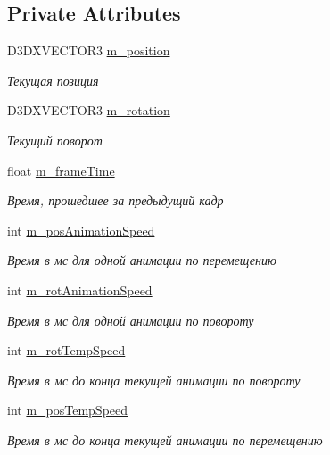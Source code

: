 \subsection*{Private Attributes}
\begin{DoxyCompactItemize}
\item 
D3\+D\+X\+V\+E\+C\+T\+O\+R3 \hyperlink{class_position_class_aa217d89b940ef5fdb462e8caa0d265f2}{m\+\_\+position}
\begin{DoxyCompactList}\small\item\em Текущая позиция \end{DoxyCompactList}\item 
D3\+D\+X\+V\+E\+C\+T\+O\+R3 \hyperlink{class_position_class_a1e690785eacec06ababe95e2e4fc72b0}{m\+\_\+rotation}
\begin{DoxyCompactList}\small\item\em Текущий поворот \end{DoxyCompactList}\item 
float \hyperlink{class_position_class_ac047fe3cfb109182205266dc5c843efc}{m\+\_\+frame\+Time}
\begin{DoxyCompactList}\small\item\em Время, прошедшее за предыдущий кадр \end{DoxyCompactList}\item 
int \hyperlink{class_position_class_a9ceed19ae5c1008e551315c2cc3573a1}{m\+\_\+pos\+Animation\+Speed}
\begin{DoxyCompactList}\small\item\em Время в мс для одной анимации по перемещению \end{DoxyCompactList}\item 
int \hyperlink{class_position_class_a60ba4c2e14e90da4f250b7e47ffea4d0}{m\+\_\+rot\+Animation\+Speed}
\begin{DoxyCompactList}\small\item\em Время в мс для одной анимации по повороту \end{DoxyCompactList}\item 
int \hyperlink{class_position_class_a2b8254c12435937ad154bf730c7e2e6a}{m\+\_\+rot\+Temp\+Speed}
\begin{DoxyCompactList}\small\item\em Время в мс до конца текущей анимации по повороту \end{DoxyCompactList}\item 
int \hyperlink{class_position_class_af67477235577ff5df8a6a68d0a884312}{m\+\_\+pos\+Temp\+Speed}
\begin{DoxyCompactList}\small\item\em Время в мс до конца текущей анимации по перемещению \end{DoxyCompactList}\item 

\end{DoxyCompactItemize}
